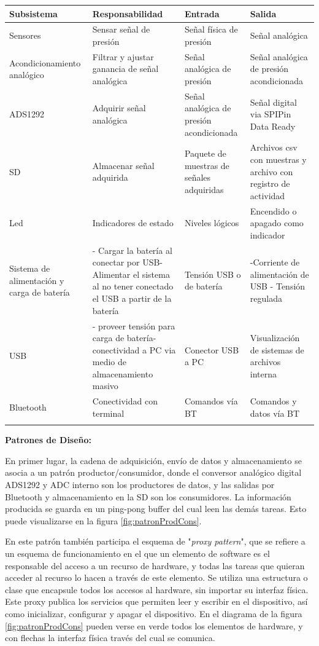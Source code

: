 \footnotesize
\begin{tabularx}{\textwidth}{XXXX}
\caption{Subsistemas del equipo} \\
\hline
\textbf{Subsistema} & \textbf{Responsabilidad} & \textbf{Entrada} & \textbf{Salida} \\ \hline
Sensores & Sensar señal de presión & Señal física de presión & Señal analógica \\ \hline
Acondicionamiento analógico & Filtrar y ajustar ganancia de señal analógica & Señal analógica de presión & Señal analógica de presión acondicionada \\ \hline
ADS1292 & Adquirir señal analógica & Señal analógica de presión acondicionada & Señal digital via SPIPin Data Ready \\ \hline
SD & Almacenar señal adquirida & Paquete de muestras de señales adquiridas & Archivos csv con muestras y archivo con registro de actividad \\ \hline
Led & Indicadores de estado & Niveles lógicos & Encendido o apagado como indicador \\ \hline
Sistema de alimentación y carga de batería & - Cargar la batería al conectar por USB- Alimentar el sistema al no tener conectado el USB a partir de la batería & Tensión USB o de batería & -Corriente de alimentación de USB - Tensión regulada \\ \hline
USB & - proveer tensión para carga de batería- conectividad a PC via medio de almacenamiento masivo & Conector USB a PC & Visualización de sistemas de archivos interna \\ \hline
Bluetooth & Conectividad con terminal & Comandos vía BT & Comandos y datos vía BT \\ \hline
\label{tab:subsistemas}\\
\end{tabularx}
\normalsize



\textbf{Patrones de Diseño:}

En primer lugar, la cadena de adquisición, envío de datos y almacenamiento se asocia a un patrón productor/consumidor, donde el conversor analógico digital ADS1292 y ADC interno son los productores de datos, y las salidas por Bluetooth y almacenamiento en la SD son los consumidores. La información producida se guarda en un ping-pong buffer \citep{zhou2017} del cual leen las demás tareas. Esto puede visualizarse en la figura \ref{fig:patronProdCons}.

En este patrón también participa el esquema de "\textit{proxy pattern}", que se refiere a un esquema de funcionamiento en el que un elemento de software es el responsable del acceso a un recurso de hardware, y todas las tareas que quieran acceder al recurso lo hacen a través de este elemento. Se utiliza una estructura o clase que encapsule todos los accesos al hardware, sin importar su interfaz física. Este proxy publica los servicios que permiten leer y escribir en el dispositivo, así como inicializar, configurar y apagar el dispositivo. En el diagrama de la figura \ref{fig:patronProdCons} pueden verse en verde todos los elementos de hardware, y con flechas la interfaz física través del cual se comunica. 

